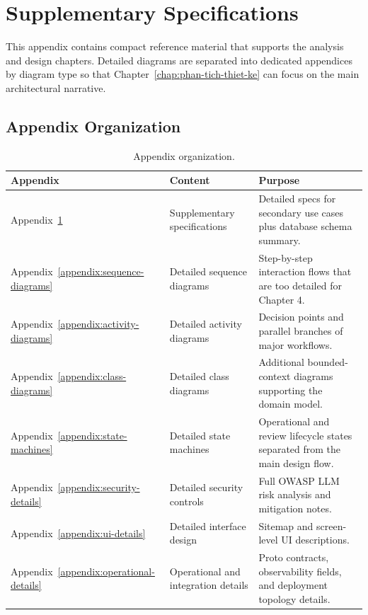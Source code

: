 \chapter{Supplementary Specifications}
\label{appendix:supplementary-specifications}

This appendix contains compact reference material that supports the
analysis and design chapters. Detailed diagrams are separated into
dedicated appendices by diagram type so that Chapter~\ref{chap:phan-tich-thiet-ke}
can focus on the main architectural narrative.

\section{Appendix Organization}
\label{appendix:organization}

\begin{table}[H]
    \centering
    \caption{Appendix organization.}
    \label{tab:appendix-organization}
    \begin{tabular}{|p{2.5cm}|p{4.2cm}|p{6.7cm}|}
        \hline
        \textbf{Appendix} & \textbf{Content} & \textbf{Purpose} \\
        \hline
        Appendix~\ref{appendix:supplementary-specifications}
            & Supplementary specifications
            & Detailed specs for secondary use cases plus database schema summary. \\
        \hline
        Appendix~\ref{appendix:sequence-diagrams}
            & Detailed sequence diagrams
            & Step-by-step interaction flows that are too detailed for Chapter 4. \\
        \hline
        Appendix~\ref{appendix:activity-diagrams}
            & Detailed activity diagrams
            & Decision points and parallel branches of major workflows. \\
        \hline
        Appendix~\ref{appendix:class-diagrams}
            & Detailed class diagrams
            & Additional bounded-context diagrams supporting the domain model. \\
        \hline
        Appendix~\ref{appendix:state-machines}
            & Detailed state machines
            & Operational and review lifecycle states separated from the main design flow. \\
        \hline
        Appendix~\ref{appendix:security-details}
            & Detailed security controls
            & Full OWASP LLM risk analysis and mitigation notes. \\
        \hline
        Appendix~\ref{appendix:ui-details}
            & Detailed interface design
            & Sitemap and screen-level UI descriptions. \\
        \hline
        Appendix~\ref{appendix:operational-details}
            & Operational and integration details
            & Proto contracts, observability fields, and deployment topology details. \\
        \hline
    \end{tabular}
\end{table}

